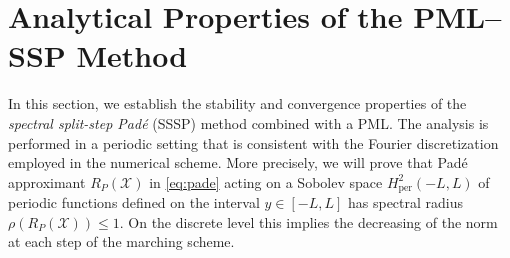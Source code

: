 \documentclass[11pt,a4paper]{article}
\newcommand{\iu}{\mathrm{i}} %
\newcommand{\cD}{\mathcal{D}}
\newcommand{\cX}{\mathcal{X}}
\theoremstyle{plain}%
\theoremstyle{definition}
\theoremstyle{remark}
\begin{document}

\section{Analytical Properties of the PML--SSP Method}\label{sec:3}
In this section, we establish the stability and convergence properties of the \textit{spectral split-step Pad\'e} (SSSP) method combined with a PML. 
The analysis is performed in a periodic setting that is consistent with the Fourier discretization employed in the numerical scheme. 
More precisely, we will prove that Pad\'e approximant $R_P(\cX)$ in \eqref{eq:pade} acting on a Sobolev space $H^2_{\mathrm{per}}(-L,L)$ of periodic functions defined on the interval $y \in [-L,L]$ has spectral radius $\rho(R_P(\cX))\le1$. 
On the discrete level this implies the decreasing of the norm at each step of the marching scheme. 
\end{document}
